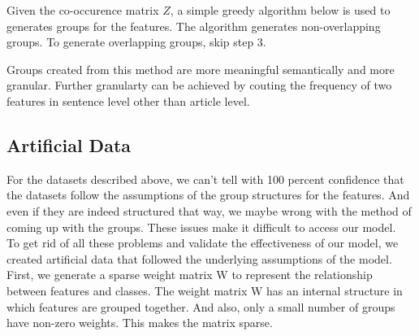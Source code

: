 \documentclass[11pt]{article}
\begin{document}
Given the co-occurence matrix $Z$, a simple greedy algorithm below is used to generates groups for the features. The algorithm generates non-overlapping groups. To generate overlapping groups, skip step 3.

\begin{algorithm}
\end{algorithm}

Groups created from this method are more meaningful semantically and more granular. Further granularty can be achieved by couting the frequency of two features in sentence level other than article level.\\

\subsection{Artificial Data}

For the datasets described above, we can't tell with 100 percent confidence that the datasets follow the assumptions of the group structures for the features. And even if they are indeed structured that way, we maybe wrong with the method of coming up with the groups. These issues make it difficult to access our model.\\ 

To get rid of all these problems and validate the effectiveness of our model, we created artificial data that followed the underlying assumptions of the model. First, we generate a sparse weight matrix W to represent the relationship between features and classes. The weight matrix W has an internal structure in which features are grouped together. And also, only a small number of groups have non-zero weights. This makes the matrix sparse.\\ 
\end{document}

